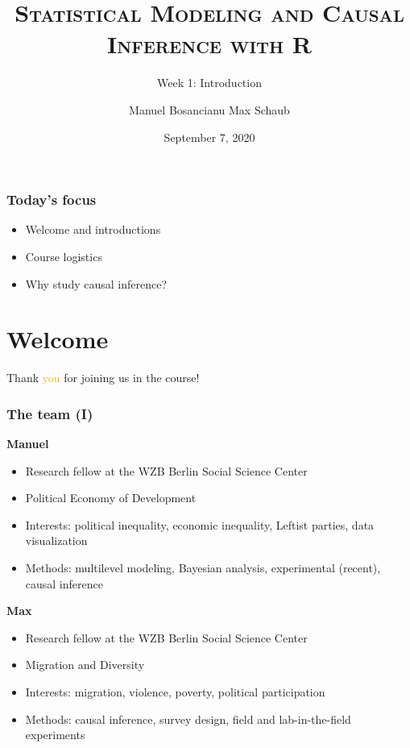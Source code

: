 \documentclass[12pt,english,dvipsnames,aspectratio=169, handout]{beamer}
\title{\textsc{Statistical Modeling and Causal Inference with R}}
\subtitle{Week 1: Introduction}
\date{September 7, 2020}
\author{Manuel Bosancianu \hfill Max Schaub}
\institute{Hertie School of Governance}
\begin{document}
\maketitle

\begin{frame}
	\frametitle{Today's focus}
	
	\begin{itemize}
		\setlength\itemsep{1.5em}
		\item Welcome and introductions
		\item Course logistics
		\item Why study causal inference?
	\end{itemize}
\end{frame}


\section{Welcome}
\begin{frame}[plain]
	\begin{center}
		\Huge Thank \textcolor{orange}{you} for joining us in the course! 
	\end{center}
\end{frame}

\begin{frame}
	\frametitle{The team (I)}
	\begin{minipage}[t]{0.48\linewidth}
		\footnotesize
		\textbf{Manuel}
		\begin{itemize}
			\item Research fellow at the WZB Berlin Social Science Center
			\item Political Economy of Development
			\item Interests: political inequality, economic inequality, Leftist parties, data visualization
			\item Methods: multilevel modeling, Bayesian analysis, experimental (recent), causal inference
		\end{itemize}
	\end{minipage}\hfill
	\begin{minipage}[t]{0.48\linewidth}
		\footnotesize
		\textbf{Max}
		\begin{itemize}
			\item Research fellow at the WZB Berlin Social Science Center
			\item Migration and Diversity
			\item Interests: migration, violence, poverty, political participation
			\item Methods: causal inference, survey design, field and lab-in-the-field experiments
		\end{itemize}
	\end{minipage}
\end{frame}
\end{document}
